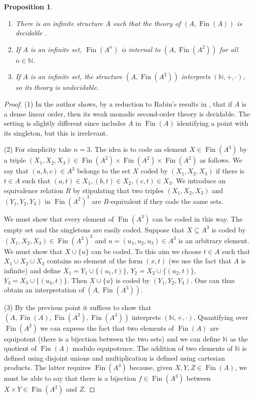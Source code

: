 \documentclass{amsart}
\newcommand{\N}{\mathbb N}
\newcommand{\Fin}{\operatorname{Fin}}
\theoremstyle{plain}
\newtheorem{prop}[thm]{Proposition}
\theoremstyle{definition}
\begin{document}
\begin{prop} \label{prop:monadic} \mbox{}
\begin{enumerate}
\item There is an infinite structure $A$ such that the theory of $(A, \Fin(A))$ is decidable \cite{Tre}. 
\item If $A$ is an infinite set, $\Fin(A^n)$ is internal to $(A, \Fin(A^2))$ for all $n\in \N$. 
\item If $A$ is an infinite set, the structure $(A, \Fin(A^2))$ interprets $(\N,+,\cdot)$, so its theory is undecidable. 
\end{enumerate} 
\end{prop}
\begin{proof}
(1) In \cite[Corollary 3.5]{Tre} the author shows, by a reduction to Rabin's results in \cite{Rabin}, that if $A$ is a dense linear order, then its weak monadic second-order theory is decidable. The setting is slightly different since \cite{Tre} includes $A$ in $\Fin(A)$ identifying a point with its singleton, but this is irrelevant.

(2) For simplicity take $n=3$. The idea is to code an element $X\in \Fin(A^3)$ by a triple $(X_1,X_2,X_3)\in \Fin(A^2)\times \Fin(A^2) \times \Fin(A^2)$ as follows. We say that $(a,b,c)\in A^3$ belongs to the set $X$ coded by $(X_1, X_2, X_3)$ if there is $t\in A$ such that $(a,t)\in X_1, (b,t)\in X_2, (c,t) \in X_3$. We introduce an equivalence relation $R$ by stipulating that two triples $(X_1,X_2,X_3)$ and $(Y_1,Y_2,Y_3)$ in  $\Fin(A^2)^3$ are $R$-equivalent if they code the same sets. 

We must show that every element of $\Fin(A^3)$ can be coded in this way. The empty set and the singletons are easily coded. Suppose that $X\subseteq A^3$ is coded by $(X_1, X_2,X_3)\in \Fin(A^2)^3$ and $u = (u_1,u_2,u_3) \in A^3$ is an arbitrary element. We must show that $X\cup \{u\}$ can be coded. To this aim we choose $t\in A$ such that $X_1 \cup X_2\cup X_3$ contains no element of the form $(x,t)$ (we use the fact that $A$ is infinite) and define $X_1 = Y_1 \cup \{(u_1,t)\}$, $Y_2 = X_2 \cup \{(u_2, t)\}$, $Y_3 = X_3 \cup \{(u_3,t)\}$. Then  $X\cup \{u\}$ is coded by $(Y_1,Y_2,Y_3)$. One can thus obtain an interpretation of $(A, \Fin(A^3))$. 

(3) By the previous point it suffices to show that $(A,\Fin(A), \Fin(A^2), \Fin(A^3))$ interprets $(\N, +, \cdot)$. Quantifying over $\Fin(A^2)$ we can express the fact that two elements of $\Fin(A)$ are equipotent (there is a bijection between the two sets) and we can define $\N$ as the quotient of $\Fin(A)$ modulo equipotence. The addition of two elements of $\N$ is defined using disjoint unions and multiplication is defined using cartesian products. The latter requires $\Fin(A^3)$ because, given $X,Y,Z\in \Fin(A)$, we must be able to say that there is a bijection $f\in \Fin(A^3)$ between $X\times Y\in \Fin(A^2)$ and $Z$. 
\end{proof}
\end{document}
